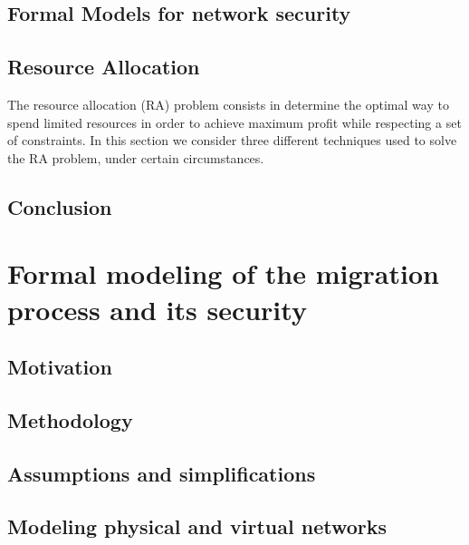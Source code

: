 \documentclass[a4paper, 11pt]{article}
\begin{document}


\subsection{Formal Models for network security}



\subsection{Resource Allocation}
The resource allocation (RA) problem consists in determine the optimal way to spend limited resources in order to achieve maximum profit while respecting a set of constraints.
In this section we consider three different techniques used to solve the RA problem, under certain circumstances. 






\subsection{Conclusion}


\newpage
\section{Formal modeling of the migration process and its security}
\subsection{Motivation}


\subsection{Methodology}


\subsection{Assumptions and simplifications}


\subsection{Modeling physical and virtual networks}

\end{document}

